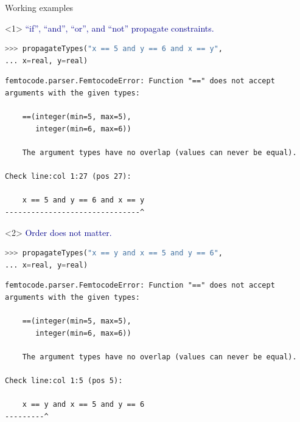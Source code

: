 \documentclass{beamer}
\begin{document}
\begin{frame}[fragile]{Working examples}
\vspace{0.5 cm}
\begin{onlyenv}<1>
\textcolor{darkblue}{``if'', ``and'', ``or'', and ``not'' propagate constraints.}
\begin{lstlisting}[language=python]
>>> propagateTypes("x == 5 and y == 6 and x == y",
... x=real, y=real)
\end{lstlisting}
\color{red}
\begin{lstlisting}[basicstyle=\ttfamily\scriptsize]
femtocode.parser.FemtocodeError: Function "==" does not accept arguments with the given types:

    ==(integer(min=5, max=5),
       integer(min=6, max=6))

    The argument types have no overlap (values can never be equal).

Check line:col 1:27 (pos 27):

    x == 5 and y == 6 and x == y
-------------------------------^
\end{lstlisting}
\end{onlyenv}
\begin{onlyenv}<2>
\textcolor{darkblue}{Order does not matter.}
\begin{lstlisting}[language=python]
>>> propagateTypes("x == y and x == 5 and y == 6",
... x=real, y=real)
\end{lstlisting}
\color{red}
\begin{lstlisting}[basicstyle=\ttfamily\scriptsize]
femtocode.parser.FemtocodeError: Function "==" does not accept arguments with the given types:

    ==(integer(min=5, max=5),
       integer(min=6, max=6))

    The argument types have no overlap (values can never be equal).

Check line:col 1:5 (pos 5):

    x == y and x == 5 and y == 6
---------^
\end{lstlisting}
\end{onlyenv}

\end{frame}
\end{document}
